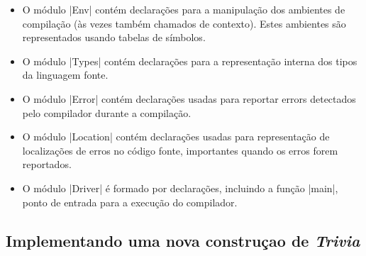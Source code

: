 \documentclass[a4paper,11pt,brazil]{article}
\newcommand{\lang}{\textsl{Trivia}}
\begin{document}
\begin{itemize}
  \item O módulo \pyginline|Env| contém declarações para a manipulação
  dos ambientes de compilação (às vezes também chamados de
  contexto). Estes ambientes são representados usando tabelas de
  símbolos.

  \item O módulo \pyginline|Types| contém declarações para a
  representação interna dos tipos da linguagem fonte.

  \item O módulo \pyginline|Error| contém declarações usadas para
  reportar errors detectados pelo compilador durante a compilação.

  \item O módulo \pyginline|Location| contém declarações usadas para
  representação de localizações de erros no código fonte, importantes
  quando os erros forem reportados.

  \item O módulo \pyginline|Driver| é formado por declarações,
  incluindo a função \pyginline|main|, ponto de entrada para a
  execução do compilador.
\end{itemize}

\subsection{Implementando uma nova construçao de \lang{}}
\end{document}
